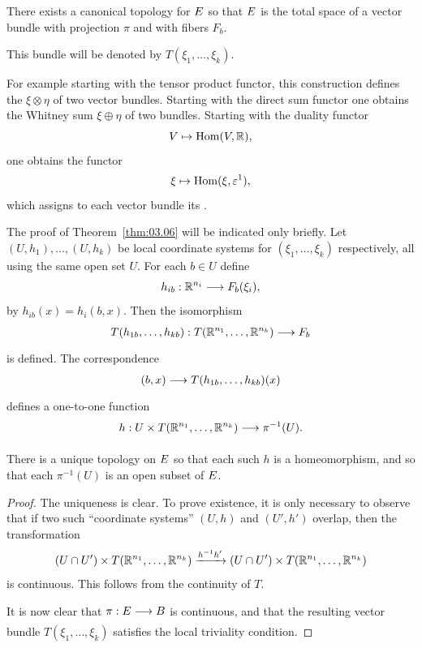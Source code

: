 \documentclass[../main]{subfiles}
\begin{document}
\begin{theorem}\label{thm:03.06}
There exists a canonical topology for $E$ so that $E$ is the total space of a vector bundle with projection $\pi$ and with fibers $F_b$.
\end{theorem}


\begin{definition}\label{def:03.05}
This bundle will be denoted by $T(\xi_1,\dots,\xi_k)$.
\end{definition}


For example starting with the tensor product functor, this construction defines the  $\xi\otimes\eta$ of two vector bundles. Starting with the direct sum functor one obtains the Whitney sum $\xi\oplus\eta$ of two bundles.
Starting with the duality functor
\[
V \mapsto \operatorname{Hom}(V,\mathbb R),
\]
one obtains the functor
\[
\xi \mapsto \operatorname{Hom}(\xi,\varepsilon^1),
\]
which assigns to each vector bundle its .

The proof of Theorem~\ref{thm:03.06} will be indicated only briefly. Let $(U,h_1),\dots, (U,h_k)$ be local coordinate systems for $(\xi_1,\dots,\xi_k)$ respectively, all using the same open set $U$. For each $b\in U$ define
\[
h_{ib}: \mathbb R^{n_{i}} \longrightarrow F_{b}(\xi_{i}),
\]
by $h_{ib}(x)=h_i(b,x)$. Then the isomorphism
\[
T(h_{1 b}, \dots, h_{k b}): T(\mathbb{R}^{n_{1}}, \dots, \bR^{n_{k}}) \varrightarrow{} F_{b}
\]
is defined. The correspondence
\[
(b, x) \varrightarrow{} T(h_{1 b}, \dots, h_{k b})(x)
\]
defines a one-to-one function
\[
h: U \times T(\bR^{n_{1}}, \dots, \bR^{n_{k}}) \varrightarrow{} \pi\inv(U).
\]


\begin{assertion*}
There is a unique topology on $E$ so that each such $h$ is a homeomorphism, and so that each $\pi^{-1}(U)$ is an open subset of $E$.
\end{assertion*}


\begin{proof}
The uniqueness is clear. To prove existence, it is only
necessary to observe that if two such ``coordinate systems'' $(U,h)$ and $(U', h')$ overlap, then the transformation 
\[
(U \cap U') \times T(\bR^{n_1}, \dots, \bR^{n_k}) \varrightarrow{h\inv  h'} (U \cap U') \times T(\bR^{n_1}, \dots, \bR^{n_k})
\]
is continuous. This follows from the continuity of $T$.

It is now clear that $\pi: \total \varrightarrow{} \B$ is continuous, and that the resulting
vector bundle $T(\xi_1,\dots,\xi_k)$ satisfies the local triviality condition.
\end{proof}
\end{document}
